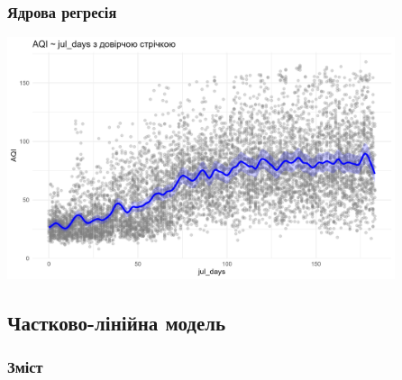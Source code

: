 \documentclass{beamer}
\begin{document}
\begin{frame}
  \frametitle{Ядрова регресія}
  
  \begin{center}
    \includegraphics[height=2.8in]{plots/lab4/kernal/model1_fit_ribbon.png}
  \end{center}
 
\end{frame}

\begin{frame}
  \section{Частково-лінійна модель}

  \frametitle{Зміст}
  \tableofcontents[currentsection]
\end{frame}
\end{document}
